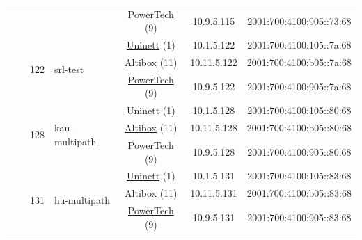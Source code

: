 \begin{small}
\begin{center}
\begin{longtable}{|c|c|c|c|c|c|c|c|}
  &  &  &  & \multicolumn{2}{|c|}{\tiny{\href{http://www.powertech.no}{PowerTech} (9)}} & \tiny{10.9.5.115} & \tiny{2001:700:4100:905::73:68} \\* \cline{3-3}\cline{4-4}\cline{5-5}\cline{6-6}\cline{7-7}\cline{8-8}
  &  & \multirow{3}{*}{\tiny{122}} & \multicolumn{1}{|l|}{\multirow{3}{*}{\tiny{srl-test}}} & \multicolumn{2}{|c|}{\tiny{\href{https://www.uninett.no}{Uninett} (1)}} & \tiny{10.1.5.122} & \tiny{2001:700:4100:105::7a:68} \\* \cline{5-5}\cline{6-6}\cline{7-7}\cline{8-8}
  &  &  &  & \multicolumn{2}{|c|}{\tiny{\href{https://www.altibox.no}{Altibox} (11)}} & \tiny{10.11.5.122} & \tiny{2001:700:4100:b05::7a:68} \\* \cline{5-5}\cline{6-6}\cline{7-7}\cline{8-8}
  &  &  &  & \multicolumn{2}{|c|}{\tiny{\href{http://www.powertech.no}{PowerTech} (9)}} & \tiny{10.9.5.122} & \tiny{2001:700:4100:905::7a:68} \\* \cline{3-3}\cline{4-4}\cline{5-5}\cline{6-6}\cline{7-7}\cline{8-8}
  &  & \multirow{3}{*}{\tiny{128}} & \multicolumn{1}{|l|}{\multirow{3}{*}{\tiny{kau-multipath}}} & \multicolumn{2}{|c|}{\tiny{\href{https://www.uninett.no}{Uninett} (1)}} & \tiny{10.1.5.128} & \tiny{2001:700:4100:105::80:68} \\* \cline{5-5}\cline{6-6}\cline{7-7}\cline{8-8}
  &  &  &  & \multicolumn{2}{|c|}{\tiny{\href{https://www.altibox.no}{Altibox} (11)}} & \tiny{10.11.5.128} & \tiny{2001:700:4100:b05::80:68} \\* \cline{5-5}\cline{6-6}\cline{7-7}\cline{8-8}
  &  &  &  & \multicolumn{2}{|c|}{\tiny{\href{http://www.powertech.no}{PowerTech} (9)}} & \tiny{10.9.5.128} & \tiny{2001:700:4100:905::80:68} \\* \cline{3-3}\cline{4-4}\cline{5-5}\cline{6-6}\cline{7-7}\cline{8-8}
  &  & \multirow{3}{*}{\tiny{131}} & \multicolumn{1}{|l|}{\multirow{3}{*}{\tiny{hu-multipath}}} & \multicolumn{2}{|c|}{\tiny{\href{https://www.uninett.no}{Uninett} (1)}} & \tiny{10.1.5.131} & \tiny{2001:700:4100:105::83:68} \\* \cline{5-5}\cline{6-6}\cline{7-7}\cline{8-8}
  &  &  &  & \multicolumn{2}{|c|}{\tiny{\href{https://www.altibox.no}{Altibox} (11)}} & \tiny{10.11.5.131} & \tiny{2001:700:4100:b05::83:68} \\* \cline{5-5}\cline{6-6}\cline{7-7}\cline{8-8}
  &  &  &  & \multicolumn{2}{|c|}{\tiny{\href{http://www.powertech.no}{PowerTech} (9)}} & \tiny{10.9.5.131} & \tiny{2001:700:4100:905::83:68} \\* \cline{3-3}\cline{4-4}\cline{5-5}\cline{6-6}\cline{7-7}\cline{8-8}

\end{longtable}
\end{center}
\end{small}
